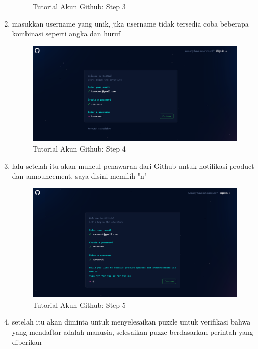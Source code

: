 \begin{enumerate}
\begin{figure}[H]
        \caption{Tutorial Akun Github: Step 3}
\end{figure}
\item masukkan username yang unik, jika username tidak tersedia coba beberapa kombinasi seperti angka dan huruf
\begin{figure}[H]
        \centerline{\includegraphics[scale=0.35]{figures/buat-akun-github/step4}}
        \caption{Tutorial Akun Github: Step 4}
\end{figure}
\item lalu setelah itu akan muncul penawaran dari Github untuk notifikasi product dan announcement, saya disini memilih "n"
\begin{figure}[H]
        \centerline{\includegraphics[scale=0.35]{figures/buat-akun-github/step5}}
        \caption{Tutorial Akun Github: Step 5}
\end{figure}
\item setelah itu akan diminta untuk menyelesaikan puzzle untuk verifikasi bahwa yang mendaftar adalah manusia, selesaikan puzze berdasarkan perintah yang diberikan
\begin{figure}[H]

\end{figure}
\end{enumerate}
